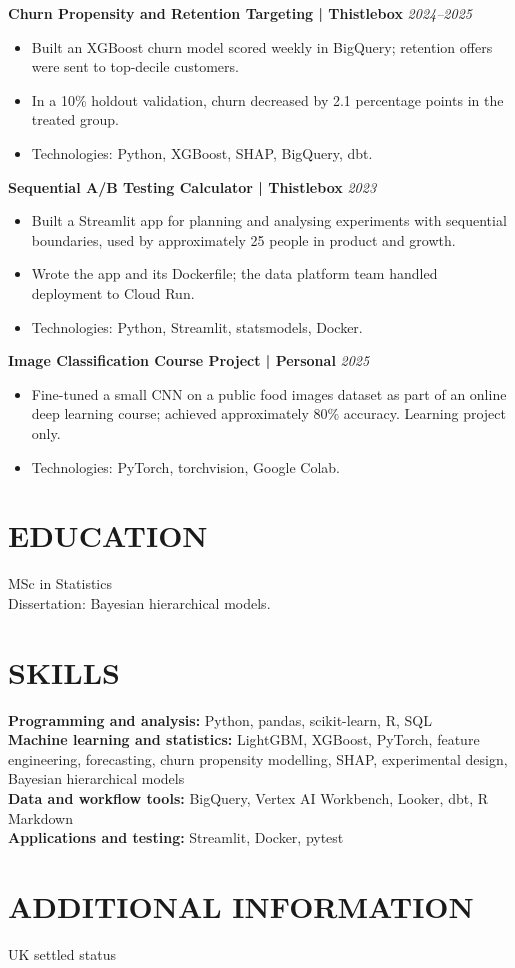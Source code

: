 \documentclass[11pt,a4paper]{article}
\begin{document}
\textbf{Churn Propensity and Retention Targeting | Thistlebox} \hfill \textit{2024–2025}
\begin{itemize}
\item Built an XGBoost churn model scored weekly in BigQuery; retention offers were sent to top-decile customers.
\item In a 10\% holdout validation, churn decreased by 2.1 percentage points in the treated group.
\item Technologies: Python, XGBoost, SHAP, BigQuery, dbt.
\end{itemize}

\textbf{Sequential A/B Testing Calculator | Thistlebox} \hfill \textit{2023}
\begin{itemize}
\item Built a Streamlit app for planning and analysing experiments with sequential boundaries, used by approximately 25 people in product and growth.
\item Wrote the app and its Dockerfile; the data platform team handled deployment to Cloud Run.
\item Technologies: Python, Streamlit, statsmodels, Docker.
\end{itemize}

\textbf{Image Classification Course Project | Personal} \hfill \textit{2025}
\begin{itemize}
\item Fine-tuned a small CNN on a public food images dataset as part of an online deep learning course; achieved approximately 80\% accuracy. Learning project only.
\item Technologies: PyTorch, torchvision, Google Colab.
\end{itemize}

\section*{EDUCATION}
MSc in Statistics\\
Dissertation: Bayesian hierarchical models.

\section*{SKILLS}
\textbf{Programming and analysis:} Python, pandas, scikit-learn, R, SQL\\
\textbf{Machine learning and statistics:} LightGBM, XGBoost, PyTorch, feature engineering, forecasting, churn propensity modelling, SHAP, experimental design, Bayesian hierarchical models\\
\textbf{Data and workflow tools:} BigQuery, Vertex AI Workbench, Looker, dbt, R Markdown\\
\textbf{Applications and testing:} Streamlit, Docker, pytest

\section*{ADDITIONAL INFORMATION}
UK settled status
\end{document}
